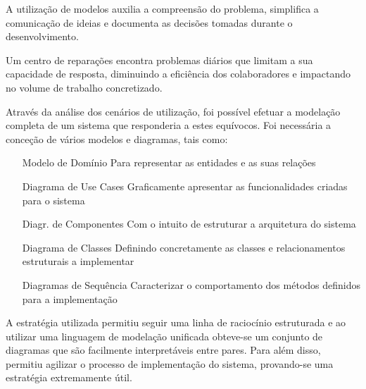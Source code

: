 \documentclass[a4paper,12pt]{scrreprt}
\begin{document}

\makecover




\renewenvironment{abstract}
{\par\noindent\textbf{\Large\abstractname}\par\bigskip}
{}

\begin{flushleft}
    \begin{abstract}
        A utilização de modelos auxilia a compreensão do problema, simplifica a comunicação de ideias e documenta as decisões tomadas durante o desenvolvimento.
        
        Um centro de reparações encontra problemas diários que limitam a sua capacidade de resposta,
        diminuindo a eficiência dos colaboradores e impactando no volume de trabalho concretizado.
        
        Através da análise dos cenários de utilização, foi possível efetuar a modelação completa de um sistema que responderia a estes equívocos.
        Foi necessária a conceção de vários modelos e diagramas, tais como:
        \begin{itemize}
            \item [Modelo de Domínio] {Para representar as entidades e as suas relações}
            \item [Diagrama de Use Cases] {Graficamente apresentar as funcionalidades criadas para o sistema}
            \item [Diagr. de Componentes] {Com o intuito de estruturar a arquitetura do sistema}
            \item [Diagrama de Classes] {Definindo concretamente as classes e relacionamentos estruturais a implementar}
            \item [Diagramas de Sequência] {Caracterizar o comportamento dos métodos definidos para a implementação}
        \end{itemize}
        
        A estratégia utilizada permitiu seguir uma linha de raciocínio estruturada e ao utilizar uma linguagem de modelação unificada obteve-se
        um conjunto de diagramas que são facilmente interpretáveis entre pares.
        Para além disso, permitiu agilizar o processo de implementação do sistema, provando-se uma estratégia extremamente útil.
        

\end{abstract}
\end{flushleft}
\end{document}
